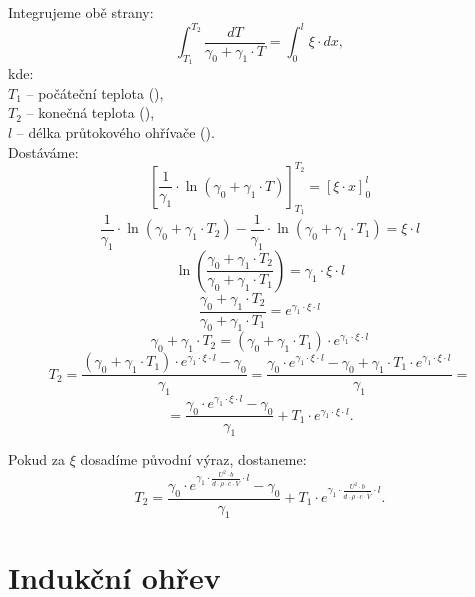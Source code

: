 \documentclass{article}
\begin{document}
Integrujeme obě strany:
$$
    \int_{T_1}^{T_2} \frac{dT}{\gamma_0 + \gamma_1 \cdot T} = \int_{0}^{l} \xi \cdot dx,
$$
kde:\\
$T_1$ -- počáteční teplota (\ueqK),\\
$T_2$ -- konečná teplota (\ueqK),\\
$l$ -- délka průtokového ohřívače (\ueqM).\\

Dostáváme:
$$
    \left[ \frac{1}{\gamma_1} \cdot \ln \left( \gamma_0 + \gamma_1 \cdot T \right) \right]_{T_1}^{T_2} = \left[ \xi \cdot x \right]_0^l
$$
$$
    \frac{1}{\gamma_1} \cdot \ln \left( \gamma_0 + \gamma_1 \cdot T_2 \right) - \frac{1}{\gamma_1} \cdot \ln \left( \gamma_0 + \gamma_1 \cdot T_1 \right) = \xi \cdot l
$$
$$
    \ln \left( \frac{\gamma_0 + \gamma_1 \cdot T_2}{\gamma_0 + \gamma_1 \cdot T_1} \right) = \gamma_1 \cdot \xi \cdot l
$$
$$
    \frac{\gamma_0 + \gamma_1 \cdot T_2}{\gamma_0 + \gamma_1 \cdot T_1} = e^{\gamma_1 \cdot \xi \cdot l}
$$
$$
    \gamma_0 + \gamma_1 \cdot T_2 = \left( \gamma_0 + \gamma_1 \cdot T_1 \right) \cdot e^{\gamma_1 \cdot \xi \cdot l}
$$
$$
    T_2 = \frac{\left( \gamma_0 + \gamma_1 \cdot T_1 \right) \cdot e^{\gamma_1 \cdot \xi \cdot l} - \gamma_0}{\gamma_1} = \frac{\gamma_0 \cdot e^{\gamma_1 \cdot \xi \cdot l} - \gamma_0 + \gamma_1 \cdot T_1 \cdot e^{\gamma_1 \cdot \xi \cdot l}}{\gamma_1} =
$$
$$
    = \frac{\gamma_0 \cdot e^{\gamma_1 \cdot \xi \cdot l} - \gamma_0}{\gamma_1} + T_1 \cdot e^{\gamma_1 \cdot \xi \cdot l}.
$$

Pokud za $\xi$ dosadíme původní výraz, dostaneme:
$$
    T_2 = \frac{\gamma_0 \cdot e^{\gamma_1 \cdot \frac{U^2 \cdot b}{d \cdot \rho \cdot c \cdot \dot{V}} \cdot l} - \gamma_0}{\gamma_1} + T_1 \cdot e^{\gamma_1 \cdot \frac{U^2 \cdot b}{d \cdot \rho \cdot c \cdot \dot{V}} \cdot l}.
$$

\newpage



\section{Indukční ohřev \spicy \spicy \spicy \spicy \spicy}
\end{document}
